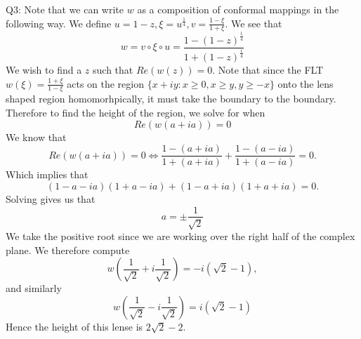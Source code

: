 \documentclass[letterpaper]{article}
\begin{document}
\noindent
Q3: Note that we can write $w$ as a composition of conformal mappings in the following way. We define $u = 1-z, \xi = u^{\frac{1}{4}}, v = \frac{1-\xi}{1+\xi}$. We see that $$w = v \circ \xi \circ u = \frac{1-(1-z)^{\frac{1}{4}}}{ 1+ (1-z)^{\frac{1}{4}}}$$
We wish to find a $z$ such that $Re(w(z))=0$. Note that since the FLT $w(\xi) = \frac{1+ \xi}{1-\xi}$ acts on the region $\{x+iy :x\geq 0,x\geq y, y\geq -x  \}$ onto the lens shaped region homomorhpically, it must take the boundary to the boundary. Therefore to find the height of the region, we solve for when $$Re(w(a+ia)) =0$$
We know that $$Re(w(a+ia)) = 0 \iff \frac{1- (a+ia)}{1+(a+ia)} + \frac{1-(a-ia)}{1+ (a-ia)} =0.$$
Which implies that $$(1-a-ia)(1+a-ia) + (1-a+ia)(1+a+ia)=0. $$
Solving gives us that $$a = \pm \frac{1}{\sqrt{2}}$$
We take the positive root since we are working over the right half of the complex plane. 
We therefore compute $$w(\frac{1}{\sqrt{2}} + i \frac{1}{\sqrt{2}}) = -i(\sqrt{2}-1),$$ 
and similarly $$w(\frac{1}{\sqrt{2}} - i \frac{1}{\sqrt{2}}) = i(\sqrt{2}-1)$$
Hence the height of this lense is $2\sqrt{2} -2$.
\end{document}
